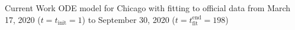 \begin{slide}{Current Work}
	{\large ODE model for Chicago with fitting to official data from March 17, 2020 ($t = t_\text{init} = 1$) to September 30, 2020 ($t = t_\text{fit}^\text{end} = 198$)}
	\begin{figure}
		\centering
	\end{figure}
\end{slide}
